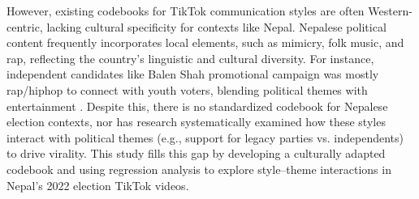 \documentclass[12pt,a4paper]{report}
\begin{document}
However, existing codebooks for TikTok communication styles \parencite{umansky2023dances} are often Western-centric, lacking cultural specificity for contexts like Nepal. Nepalese political content frequently incorporates local elements, such as mimicry, folk music, and rap, reflecting the country’s linguistic and cultural diversity. For instance, independent candidates like Balen Shah promotional campaign was mostly rap/hiphop to connect with youth voters, blending political themes with entertainment \parencite{menge2022kathmandu}. Despite this, there is no standardized codebook for Nepalese election contexts, nor has research systematically examined how these styles interact with political themes (e.g., support for legacy parties vs. independents) to drive virality. This study fills this gap by developing a culturally adapted codebook and using regression analysis to explore style–theme interactions in Nepal’s 2022 election TikTok videos.




\end{document}

